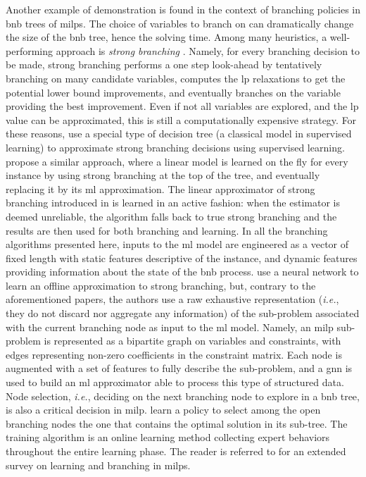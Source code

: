 \documentclass[11pt]{article}
\begin{document}
		Another example of demonstration is found in the context of branching policies in \gls{bnb} trees
		of \glspl{milp}.
		The choice of variables to branch on can dramatically change the size of the \gls{bnb} tree, hence
		the solving time.
		Among many heuristics, a well-performing approach is \emph{strong branching} \citep{applegate2007}.
		Namely, for every branching decision to be made, strong branching performs a one step look-ahead by
		tentatively branching on many candidate variables, computes the \gls{lp} relaxations to get the
		potential lower bound improvements, and eventually branches on the variable providing the best
		improvement.
		Even if not all variables are explored, and the \gls{lp} value can be approximated, this is still a
		computationally expensive strategy.
		For these reasons, \cite{MarcosAlvarezsupervisedmachinelearning2014,
		MarcosAlvarezMachineLearningBasedApproximation2017} use a special type of decision tree (a
		classical model in supervised learning) to approximate strong branching decisions using supervised
		learning.
		\cite{KhalilLearningbranchmixed2016} propose a similar approach, where a linear model is
		learned on the fly for every instance by using strong branching at the top of the tree, and
		eventually replacing it by its \gls{ml} approximation.
		The linear approximator of strong branching introduced in
		\cite{MarcosAlvarezOnlineLearningStrong2016} is learned in an active fashion: when the estimator is
		deemed unreliable, the algorithm falls back to true strong branching and the results are then used
		for both branching and learning.
		In all the branching algorithms presented here, inputs to the \gls{ml} model are engineered as a
		vector of fixed length with static features descriptive of the instance, and dynamic features
		providing information about the state of the \gls{bnb} process.
		\cite{GasseExact2019} use a neural network to learn an offline approximation to strong
		branching, but, contrary to the aforementioned papers, the authors use a raw exhaustive
		representation (\textit{i.e.}, they do not discard nor aggregate any information) of the
		sub-problem associated with the current branching node as input to the \gls{ml} model.
		Namely, an \gls{milp} sub-problem is represented as a bipartite graph on variables and constraints,
		with edges representing non-zero coefficients in the constraint matrix.
		Each node is augmented with a set of features to fully describe the sub-problem, and a \gls{gnn} is
		used to build an \gls{ml} approximator able to process this type of structured data.
		Node selection, \textit{i.e.}, deciding on the next branching node to explore in a \gls{bnb} tree,
		is also a critical decision in \gls{milp}.
		\cite{HeLearningSearchBranch2014} learn a policy to select among the open branching
		nodes the one that contains the optimal solution in its sub-tree.
		The training algorithm is an online learning method collecting expert behaviors throughout the
		entire learning phase.
		The reader is referred to \cite{Lodilearningbranchingsurvey2017} for an extended survey on learning
		and branching in \glspl{milp}.
\end{document}
